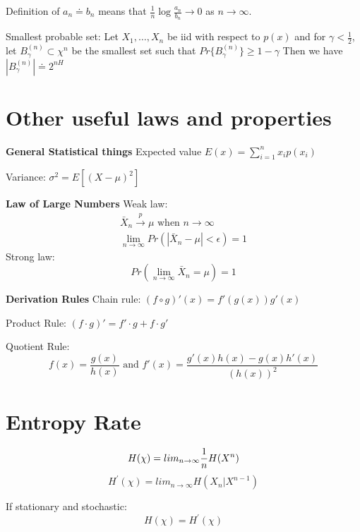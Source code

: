 \documentclass[10pt]{article}
\begin{document}
\begin{scriptsize}
\begin{multicols}{3}
Definition of $a_n \doteq b_n$ means that $\frac{1}{n}\log \frac{a_n}{b_n} \rightarrow 0$ as $n\rightarrow \infty$.

Smallest probable set: Let $X_1,\ldots, X_n$ be iid with respect to $p(x)$ and for $\gamma < \frac{1}{2}$, let $B_\gamma^{(n)} \subset \chi^n$ be the smallest set such that $Pr\{ B_\gamma^{(n)} \} \geq 1-\gamma $ Then we have $|B_\gamma^{(n)}| \doteq 2^{nH}$

\section*{Other useful laws and properties}
{\bf General Statistical things} Expected value $E(x)=\sum_{i=1}^n x_i p(x_i)$

Variance: $\sigma^2 = E\left[ \left(X-\mu\right)^2\right]$

{\bf Law of Large Numbers} Weak law:
\begin{eqnarray*}
\bar{X}_n\overset{p}\rightarrow \mu \text{ when } n \rightarrow \infty\\
\lim_{n\rightarrow \infty} Pr\left(|\bar{X}_n-\mu| < \epsilon \right) = 1
\end{eqnarray*}
Strong law:
\begin{equation}
Pr\left(\lim_{n\rightarrow \infty} \bar{X}_n = \mu \right) = 1
\end{equation}

{\bf Derivation Rules} Chain rule: $(f \circ g)'(x)=f'(g(x))g'(x)$

Product Rule: $(f\cdot g)' = f' \cdot g + f \cdot g'$

Quotient Rule: \[f(x)=\frac{g(x)}{h(x)}\text{ and }f'(x)=\frac{g'(x)h(x)-g(x)h'(x)}{\left(h(x)\right)^2}\]


\section*{Entropy Rate}
\begin{equation}
H(\chi) = lim_{n \to \infty} \frac{1}{n} H(X^n) \\
\end{equation}
\begin{equation}
H^\prime(\chi) = lim_{n \to \infty} H(X_n | X^{n-1})
\end{equation}

\noindent If stationary and stochastic:
\begin{equation}
H(\chi) = H^\prime(\chi)
\end{equation}


\end{multicols}
\end{scriptsize}
\end{document}
